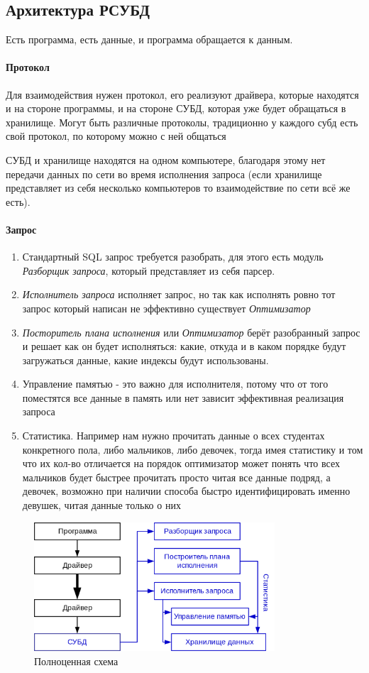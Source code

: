 \subsection{Архитектура РСУБД}
Есть программа, есть данные, и программа обращается к данным. \paragraph{Протокол} Для взаимодействия нужен протокол, его реализуют драйвера, которые находятся и на стороне программы, и на стороне СУБД, которая уже будет обращаться в хранилище. Могут быть различные протоколы, традиционно у каждого субд есть свой протокол, по которому можно с ней общаться
\begin{remark}
	СУБД и хранилище находятся на одном компьютере, благодаря этому нет передачи данных по сети во время исполнения запроса (если хранилище представляет из себя несколько компьютеров то взаимодействие по сети всё же есть).
\end{remark}
\paragraph{Запрос}
\begin{enumerate}
	\item Стандартный SQL запрос требуется разобрать, для этого есть модуль \textit{Разборщик запроса}, который представляет из себя парсер.
	\item \textit{Исполнитель запроса} исполняет запрос, но так как исполнять ровно тот запрос
	      который написан не эффективно существует \textit{Оптимизатор}
	\item \textit{Посторитель плана исполнения} или \textit{Оптимизатор} берёт разобранный
	      запрос и решает как он будет исполняться: какие, откуда и в каком порядке будут загружаться данные, какие индексы будут использованы.
	\item Управление памятью - это важно для исполнителя, потому что от того поместятся все данные в память или нет зависит эффективная реализация запроса
	\item Статистика. Например нам нужно прочитать данные о всех студентах конкретного пола, либо мальчиков, либо девочек, тогда имея статистику и том что их кол-во отличается на порядок оптимизатор может понять что всех мальчиков будет быстрее прочитать просто читая все данные подряд, а девочек, возможно при наличии способа быстро идентифицировать именно девушек, читая данные только о них
\end{enumerate}

\begin{figure}[h]
	\centering
	\includegraphics[width=0.8\textwidth]{../assets/kgeorgiy/intro/intro_arch_complete.svg.png}
	\caption{Полноценная схема}
	\label{proj-def}
\end{figure}
